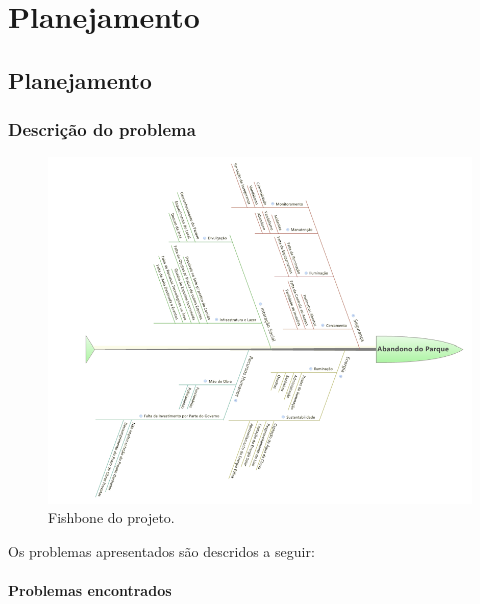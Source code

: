 \part{Planejamento}

\chapter[Planejamento]{Planejamento}

\section{Descri\c{c}\~ao do problema}

\begin{figure}[H]
	\centering
	\label{FISHBONE}
		\includegraphics[keepaspectratio=true,scale=0.6]{planejamento/FISHBONE_complete.png}
	\caption{Fishbone do projeto.}
\end{figure}

Os problemas apresentados s\~ao descridos a seguir:

\subsection{Problemas encontrados}

